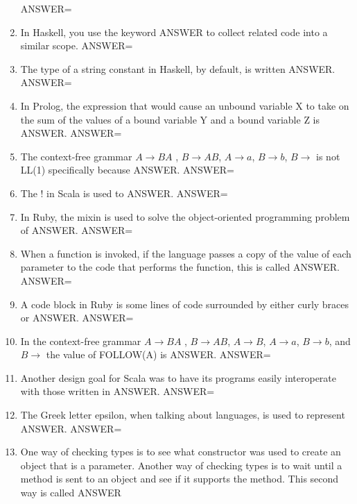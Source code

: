 \documentclass{exam}
\begin{document}
\begin{enumerate}
ANSWER=
\item In Haskell, you use the keyword ANSWER to collect related code into a similar scope.\newline
ANSWER=
\item The type of a string constant in Haskell, by default, is written ANSWER.\newline
ANSWER=
\item In Prolog, the expression that would cause an unbound variable X to take on the sum of the values of a bound variable Y and a bound variable Z is ANSWER.\newline
ANSWER=
\item The context-free grammar $A \rightarrow B A$ , $B \rightarrow A B$, $A \rightarrow a$, $B \rightarrow b$, $B \rightarrow$  is not LL(1) specifically because ANSWER.\newline
ANSWER=
\item The ! in Scala is used to ANSWER.\newline
ANSWER=
\item In Ruby, the mixin is used to solve the object-oriented programming problem of ANSWER.\newline
ANSWER=
\item When a function is invoked, if the language passes a copy of the value of each parameter to the code that performs the function, this is called ANSWER.\newline
ANSWER=
\item A code block in Ruby is some lines of code surrounded by either curly braces or ANSWER.\newline
ANSWER=
\item In the context-free grammar $A \rightarrow B A$ , $B \rightarrow A B$, $A \rightarrow B$, $A \rightarrow a$, $B \rightarrow b$, and $B \rightarrow$  the value of FOLLOW(A) is ANSWER.\newline
ANSWER=
\item Another design goal for Scala was to have its programs easily interoperate with those written in ANSWER.\newline
ANSWER=
\item The Greek letter epsilon, when talking about languages, is used to represent ANSWER.\newline
ANSWER=
\item One way of checking types is to see what constructor was used to create an object that is a parameter.  Another way of checking types is to wait until a method is sent to an object and see if it supports the method.  This second way is called ANSWER\newline

\end{enumerate}
\end{document}
